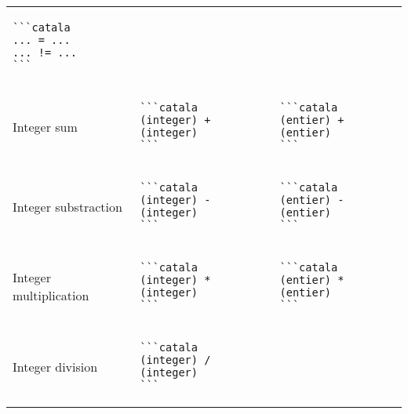 \documentclass[a3paper,landscape]{article}
\begin{document}
\begin{multicols*}{2}
\begin{center}
\begin{tabular}{p{}p{}p{}}
\begin{verbatim}
```catala
... = ...
... != ...
```
\end{verbatim}
      \vspace*{-1.75em}
      \\
      Integer sum                     &
      \vspace*{-1.75em}
      \begin{verbatim}
```catala
(integer) + (integer)
```
\end{verbatim}
      \vspace*{-1.75em}
                                      &
      \vspace*{-1.75em}
      \begin{verbatim}
```catala
(entier) + (entier)
```
\end{verbatim}
      \vspace*{-1.75em}
      \\
      Integer substraction            &
      \vspace*{-1.75em}
      \begin{verbatim}
```catala
(integer) - (integer)
```
\end{verbatim}
      \vspace*{-1.75em}
                                      &
      \vspace*{-1.75em}
      \begin{verbatim}
```catala
(entier) - (entier)
```
\end{verbatim}
      \vspace*{-1.75em}
      \\
      Integer multiplication          &
      \vspace*{-1.75em}
      \begin{verbatim}
```catala
(integer) * (integer)
```
\end{verbatim}
      \vspace*{-1.75em}
                                      &
      \vspace*{-1.75em}
      \begin{verbatim}
```catala
(entier) * (entier)
```
\end{verbatim}
      \vspace*{-1.75em}
      \\
      Integer division                &
      \vspace*{-1.75em}
      \begin{verbatim}
```catala
(integer) / (integer)
```
\end{verbatim}
      \vspace*{-1.75em}

\end{tabular}
\end{center}
\end{multicols*}
\end{document}
